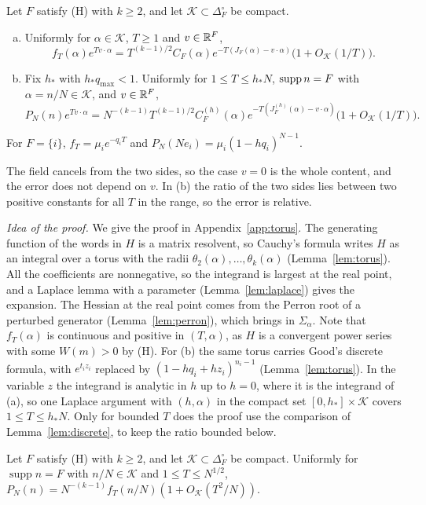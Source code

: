 \begin{theorem}\label{thm:local}
Let $F$ satisfy \textup{(H)} with $k\ge2$, and let $\mathcal K\subset\Delta_F^\circ$ be
compact.
\begin{enumerate}[(a)]
\item Uniformly for $\alpha\in\mathcal K$, $T\ge1$ and $v\in\mathbb{R}^F$,
\[
f_T(\alpha)e^{Tv\cdot\alpha}=T^{(k-1)/2}C_F(\alpha)e^{-T(J_F(\alpha)-v\cdot\alpha)}\bigl(1+O_{\mathcal K}(1/T)\bigr).
\]
\item Fix $h_*$ with $h_*q_{\max}<1$. Uniformly for $1\le T\le h_*N$,
$\operatorname{supp} n=F$ with $\alpha=n/N\in\mathcal K$, and $v\in\mathbb{R}^F$,
\[
P_N(n)e^{Tv\cdot\alpha}=N^{-(k-1)}T^{(k-1)/2}C^{(h)}_F(\alpha)
e^{-T(J^{(h)}_F(\alpha)-v\cdot\alpha)}\bigl(1+O_{\mathcal K}(1/T)\bigr).
\]
\end{enumerate}
For $F=\{i\}$, $f_T=\mu_ie^{-q_iT}$ and $P_N(Ne_i)=\mu_i(1-hq_i)^{N-1}$.
\end{theorem}

The field cancels from the two sides, so the case $v=0$ is the whole content, and the
error does not depend on $v$. In (b) the ratio of the two sides lies between two
positive constants for all $T$ in the range, so the error is relative.

\emph{Idea of the proof.} We give the proof in Appendix~\ref{app:torus}. The
generating function of the words in $H$ is a matrix resolvent, so
Cauchy's formula writes $H$ as an integral over a torus with the radii
$\theta_2(\alpha),\dots,\theta_k(\alpha)$ (Lemma~\ref{lem:torus}).
All the coefficients are nonnegative, so the integrand is largest at the real
point, and a Laplace lemma with a parameter (Lemma~\ref{lem:laplace}) gives the
expansion. The Hessian at the real point comes from the Perron root of a
perturbed generator (Lemma~\ref{lem:perron}), which brings in $\Sigma_\alpha$.
Note that $f_T(\alpha)$ is continuous and positive in $(T,\alpha)$, as
$H$ is a convergent power series with some $W(m)>0$ by (H). For (b) the same torus
carries Good's discrete formula, with $e^{t_iz_i}$ replaced by $(1-hq_i+hz_i)^{n_i-1}$
(Lemma~\ref{lem:torus}). In the variable $z$ the integrand is analytic in $h$ up to
$h=0$, where it is the integrand of (a), so one Laplace argument with $(h,\alpha)$ in
the compact set $[0,h_*]\times\mathcal K$ covers $1\le T\le h_*N$. Only for
bounded $T$ does the proof use the comparison of Lemma~\ref{lem:discrete}, to keep
the ratio bounded below.

\begin{lemma}\label{lem:discrete}
Let $F$ satisfy \textup{(H)} with $k\ge2$, and let $\mathcal K\subset\Delta_F^\circ$ be
compact. Uniformly for $\operatorname{supp}n=F$ with $n/N\in\mathcal K$ and
$1\le T\le N^{1/2}$,
$P_N(n)=N^{-(k-1)}f_T(n/N)(1+O_{\mathcal K}(T^2/N))$.
\end{lemma}

